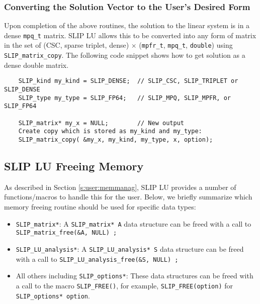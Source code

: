 \documentclass[12pt]{article}
\theoremstyle{definition}
\begin{document}
\subsubsection{Converting the Solution Vector to the User's Desired Form}

Upon completion of the above routines, the solution to the linear system is
in a dense \verb|mpq_t| matrix. SLIP LU allows this to be converted into any
form of matrix in the set of (CSC, sparse triplet, dense) $\times$
(\verb|mpfr_t|, \verb|mpq_t|, \verb|double|) using
\verb|SLIP_matrix_copy|. The following code snippet shows how to get solution
as a dense double matrix.

{\small
\begin{verbatim}
    SLIP_kind my_kind = SLIP_DENSE;  // SLIP_CSC, SLIP_TRIPLET or SLIP_DENSE
    SLIP_type my_type = SLIP_FP64;   // SLIP_MPQ, SLIP_MPFR, or SLIP_FP64

    SLIP_matrix* my_x = NULL;        // New output
    Create copy which is stored as my_kind and my_type:
    SLIP_matrix_copy( &my_x, my_kind, my_type, x, option);\end{verbatim} }

\cprotect\subsection{SLIP LU Freeing Memory}
\label{s:Using:free}

As described in Section \ref{s:user:memmanag}, SLIP LU provides a number
of functions/macros to handle this for the user. Below, we briefly summarize
which memory freeing routine should be used for specific data types:

\begin{itemize}
\item \verb|SLIP_matrix*|: A \verb|SLIP_matrix* A| data structure can be freed
with a call to \verb|SLIP_matrix_free(&A, NULL) ;|

\item \verb|SLIP_LU_analysis*|: A \verb|SLIP_LU_analysis* S| data structure can
be freed with a call to \verb|SLIP_LU_analysis_free(&S, NULL) ;|

\item All others including \verb|SLIP_options*|: These data structures can be
freed with a call to the macro \verb|SLIP_FREE()|, for example,
\verb|SLIP_FREE(option)| for \newline
\verb|SLIP_options* option|.

\end{itemize}
\end{document}
